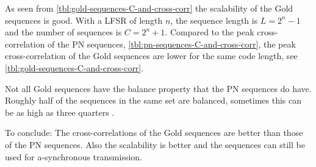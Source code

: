 As seen from \autoref{tbl:gold-sequences-C-and-cross-corr} the scalability of the Gold sequences is good.
With a LFSR of length $n$, the sequence length is $L = 2^n - 1$ and the number of sequences is $C = 2^n + 1$.
Compared to the peak cross-correlation of the PN sequences, \autoref{tbl:pn-sequences-C-and-cross-corr}, the peak cross-correlation of the Gold sequences are lower for the same code length, see \autoref{tbl:gold-sequences-C-and-cross-corr}.





%
%
%
%		
%



Not all Gold sequences have the balance property that the PN sequences do have.
Roughly half of the sequences in the same set are balanced, sometimes this can be as high as three quarters \cite{holmes2007spread}.


To conclude: The cross-correlations of the Gold sequences are better than those of the PN sequences.
Also the scalability is better and the sequences can still be used for a-synchronous transmission.












